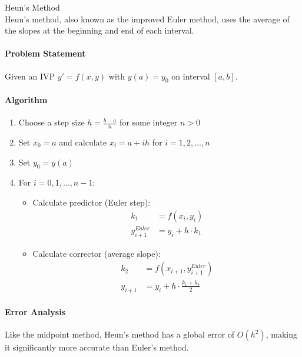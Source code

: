 \begin{KR}{Heun's Method}\\
Heun's method, also known as the improved Euler method, uses the average of the slopes at the beginning and end of each interval.

\paragraph{Problem Statement}
Given an IVP $y' = f(x,y)$ with $y(a) = y_0$ on interval $[a,b]$.

\paragraph{Algorithm}
\begin{enumerate}
    \item Choose a step size $h = \frac{b-a}{n}$ for some integer $n > 0$
    \item Set $x_0 = a$ and calculate $x_i = a + ih$ for $i = 1, 2, \ldots, n$
    \item Set $y_0 = y(a)$
    \item For $i = 0, 1, \ldots, n-1$:
    \begin{itemize}
        \item Calculate predictor (Euler step):
        \begin{align*}
        k_1 &= f(x_i, y_i)\\
        y_{i+1}^{Euler} &= y_i + h \cdot k_1
        \end{align*}
        \item Calculate corrector (average slope):
        \begin{align*}
        k_2 &= f(x_{i+1}, y_{i+1}^{Euler})\\
        y_{i+1} &= y_i + h \cdot \frac{k_1 + k_2}{2}
        \end{align*}
    \end{itemize}
\end{enumerate}

\paragraph{Error Analysis}
Like the midpoint method, Heun's method has a global error of $O(h^2)$, making it significantly more accurate than Euler's method.
\end{KR}

